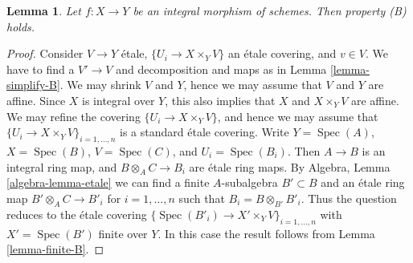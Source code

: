\documentclass[10pt,a4paper]{amsart}
\theoremstyle{plain}
\newtheorem{lemma}[subsection]{Lemma}
\theoremstyle{definition}
\theoremstyle{remark}
\numberwithin{equation}{subsection}
\def\Spec{\mathop{\mathrm{Spec}}}
\begin{document}
\begin{lemma}
\label{lemma-integral-B}
Let $f : X \to Y$ be an integral morphism of schemes.
Then property (B) holds.
\end{lemma}

\begin{proof}
Consider $V \to Y$ \'etale, $\{U_i \to X \times_Y V\}$ an \'etale covering, and
$v \in V$. We have to find a $V' \to V$ and decomposition and maps as in
Lemma \ref{lemma-simplify-B}.
We may shrink $V$ and $Y$, hence we may assume that $V$ and $Y$ are affine.
Since $X$ is integral over $Y$, this also implies that $X$ and
$X \times_Y V$ are affine. We may refine the covering
$\{U_i \to X \times_Y V\}$, and hence we may assume that
$\{U_i \to X \times_Y V\}_{i = 1, \ldots, n}$ is a standard \'etale covering.
Write $Y = \Spec(A)$, $X = \Spec(B)$,
$V = \Spec(C)$, and $U_i = \Spec(B_i)$.
Then $A \to B$ is an integral ring map, and $B \otimes_A C \to B_i$ are
\'etale ring maps. By
Algebra, Lemma \ref{algebra-lemma-etale}
we can find a finite $A$-subalgebra $B' \subset B$ and an \'etale ring
map $B' \otimes_A C \to B'_i$ for $i = 1, \ldots, n$
such that $B_i = B \otimes_{B'} B'_i$. Thus the question
reduces to the \'etale covering
$\{\Spec(B'_i) \to X' \times_Y V\}_{i = 1, \ldots, n}$
with $X' = \Spec(B')$ finite over $Y$.
In this case the result follows from
Lemma \ref{lemma-finite-B}.
\end{proof}
\end{document}
